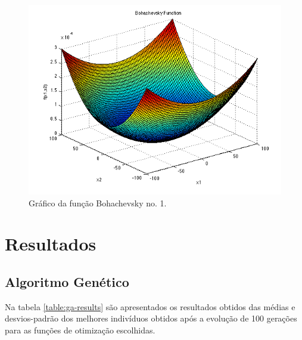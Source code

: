 \documentclass[a4paper,12pt]{article}
\begin{document}
\begin{figure}[htb]
\begin{center}
    \includegraphics[scale=0.5]{boha.png}
    \caption { Gráfico da função Bohachevsky no. 1. }
    \label{fig:boha}
\end{center}
\end{figure}



\thispagestyle{main}

\section{Resultados}

\subsection{Algoritmo Genético}

Na tabela \ref{table:ga-results} são apresentados os resultados obtidos das médias e desvios-padrão dos melhores indivíduos obtidos após a evolução de 100 gerações para as funções de otimização escolhidas.
\end{document}
